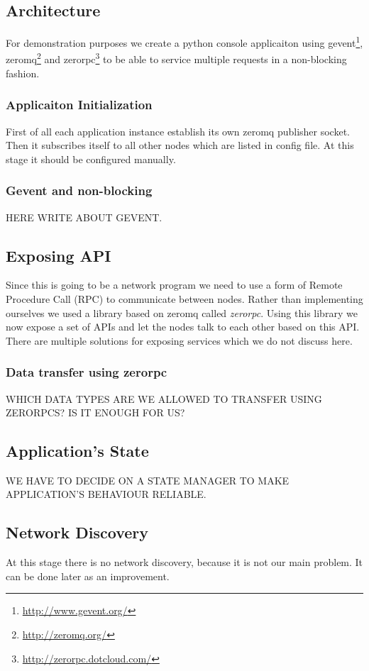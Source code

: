 \subsection{Architecture}
For demonstration purposes we create a python console applicaiton using gevent\footnote{\url{http://www.gevent.org/}}, zeromq\footnote{\url{http://zeromq.org/}} and zerorpc\footnote{\url{http://zerorpc.dotcloud.com/}} to be able to service multiple requests in a non-blocking fashion.

\subsubsection{Applicaiton Initialization}
First of all each application instance establish its own zeromq publisher socket. Then it subscribes itself to all other nodes which are listed in config file. At this stage it should be configured manually.

\subsubsection{Gevent and non-blocking}
HERE WRITE ABOUT GEVENT.

\subsection{Exposing API}
Since this is going to be a network program we need to use a form of Remote Procedure Call (RPC) to communicate between nodes. Rather than implementing ourselves we used a library based on zeromq called \textit{zerorpc}. Using this library we now expose a set of APIs and let the nodes talk to each other based on this API. There are multiple solutions for exposing services which we do not discuss here.

\subsubsection{Data transfer using zerorpc}
WHICH DATA TYPES ARE WE ALLOWED TO TRANSFER USING ZERORPCS? IS IT ENOUGH FOR US?

\subsection{Application's State}
WE HAVE TO DECIDE ON A STATE MANAGER TO MAKE APPLICATION'S BEHAVIOUR RELIABLE.

\subsection{Network Discovery}
At this stage there is no network discovery, because it is not our main problem. It can be done later as an improvement.

